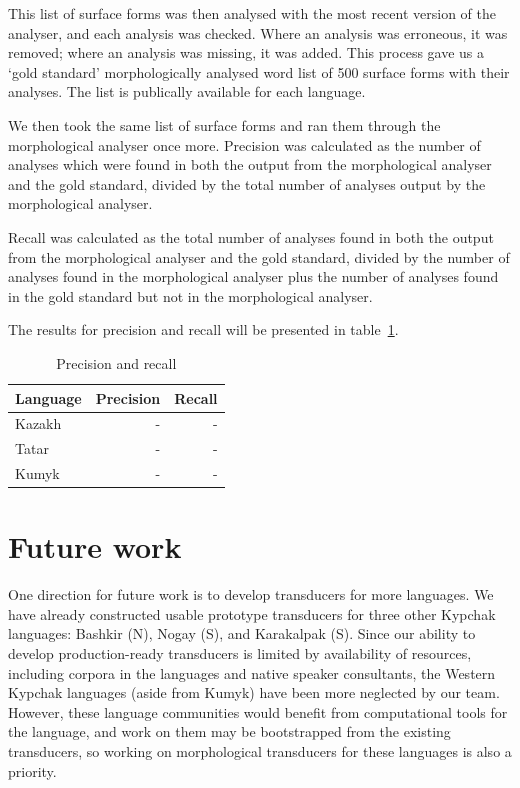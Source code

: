 \documentclass[a4paper,11pt,twocolumn]{article}
\begin{document}
This list of surface forms was then analysed with the most recent version of the analyser, and each analysis was checked.  Where an analysis was erroneous, it was removed; where an analysis was missing, it was added.  This process gave us a `gold standard' morphologically analysed word list of 500 surface forms with their analyses.  The list is publically available for each language.%

We then took the same list of surface forms and ran them through the morphological analyser once more.  Precision was calculated as the number of analyses which were found in both the output from the morphological analyser and the gold standard, divided by the total number of analyses output by the morphological analyser.

Recall was calculated as the total number of analyses found in both the output from the morphological analyser and the gold standard, divided by the number of analyses found in the morphological analyser plus the number of analyses found in the gold standard but not in the morphological analyser.

The results for precision and recall will be presented in table~\ref{table:precrecall}.


\begin{table}
\begin{center}
	\begin{tabular}{lrr}
	\toprule
		\textbf{Language} & \textbf{Precision} & \textbf{Recall} \\
	\midrule
		Kazakh & - &  - \\
		Tatar & - & - \\
		Kumyk & - & - \\
	\bottomrule
	\end{tabular}
	\caption{Precision and recall}
	\label{table:precrecall}
\end{center}
\end{table}


\section{Future work}


One direction for future work is to develop transducers for more languages.  We have already constructed usable prototype transducers for three other Kypchak languages: Bashkir (N), Nogay (S), and Karakalpak (S).  Since our ability to develop production-ready transducers is limited by availability of resources, including corpora in the languages and native speaker consultants, the Western Kypchak languages (aside from Kumyk) have been more neglected by our team.  However, these language communities would benefit from computational tools for the language, and work on them may be bootstrapped from the existing transducers, so working on morphological transducers for these languages is also a priority.
\end{document}
